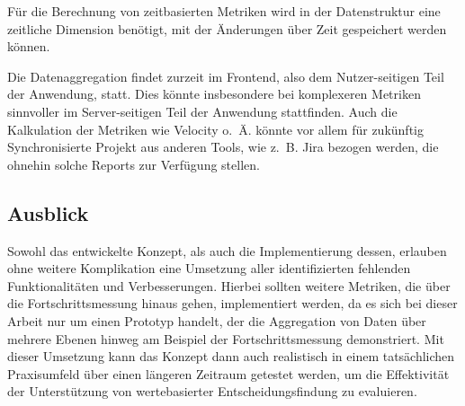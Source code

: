 Für die Berechnung von zeitbasierten Metriken wird in der Datenstruktur eine zeitliche Dimension benötigt, mit der Änderungen über Zeit gespeichert werden können.

Die Datenaggregation findet zurzeit im Frontend, also dem Nutzer-seitigen Teil der Anwendung, statt. Dies könnte insbesondere bei komplexeren Metriken sinnvoller im Server-seitigen Teil der Anwendung stattfinden. Auch die Kalkulation der Metriken wie Velocity o. Ä. könnte vor allem für zukünftig Synchronisierte Projekt aus anderen Tools, wie z. B. Jira bezogen werden, die ohnehin solche Reports zur Verfügung stellen.

\subsection{Ausblick}
Sowohl das entwickelte Konzept, als auch die Implementierung dessen, erlauben ohne weitere Komplikation eine Umsetzung aller identifizierten fehlenden Funktionalitäten und Verbesserungen. Hierbei sollten weitere Metriken, die über die Fortschrittsmessung hinaus gehen, implementiert werden, da es sich bei dieser Arbeit nur um einen Prototyp handelt, der die Aggregation von Daten über mehrere Ebenen hinweg am Beispiel der Fortschrittsmessung demonstriert.
Mit dieser Umsetzung kann das Konzept dann auch realistisch in einem tatsächlichen Praxisumfeld über einen längeren Zeitraum getestet werden, um die Effektivität der Unterstützung von wertebasierter Entscheidungsfindung zu evaluieren.
